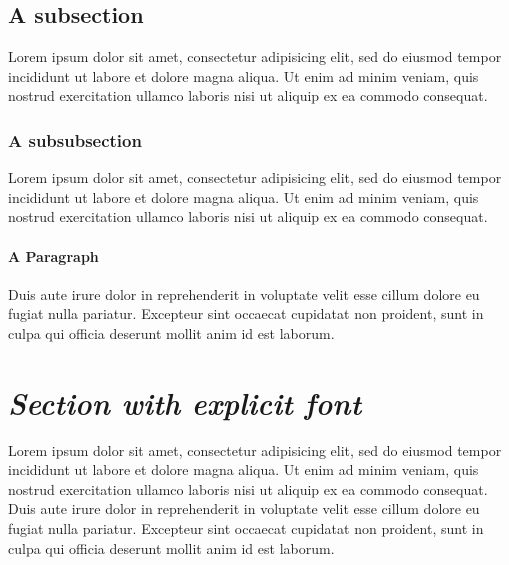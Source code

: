 \documentclass{amsart}
\theoremstyle{definition}
\theoremstyle{remark}
\numberwithin{equation}{section}
\begin{document}
\subsection{A subsection}
Lorem ipsum dolor sit amet, consectetur adipisicing elit, sed do eiusmod tempor incididunt ut labore et dolore magna aliqua. Ut enim ad minim veniam, quis nostrud exercitation ullamco laboris nisi ut aliquip ex ea commodo consequat.

\subsubsection{A subsubsection}
Lorem ipsum dolor sit amet, consectetur adipisicing elit, sed do eiusmod tempor incididunt ut labore et dolore magna aliqua. Ut enim ad minim veniam, quis nostrud exercitation ullamco laboris nisi ut aliquip ex ea commodo consequat.

\paragraph{A Paragraph}
 Duis aute irure dolor in reprehenderit in voluptate velit esse cillum dolore eu fugiat nulla pariatur. Excepteur sint occaecat cupidatat non proident, sunt in culpa qui officia deserunt mollit anim id est laborum.

\section{\itshape Section with explicit font}
Lorem ipsum dolor sit amet, consectetur adipisicing elit, sed do eiusmod tempor incididunt ut labore et dolore magna aliqua. Ut enim ad minim veniam, quis nostrud exercitation ullamco laboris nisi ut aliquip ex ea commodo consequat. Duis aute irure dolor in reprehenderit in voluptate velit esse cillum dolore eu fugiat nulla pariatur. Excepteur sint occaecat cupidatat non proident, sunt in culpa qui officia deserunt mollit anim id est laborum.
\end{document}
